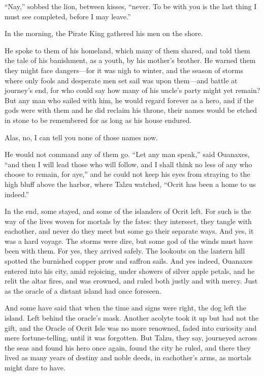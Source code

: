 ``Nay,'' sobbed the lion, between kisses, ``never. To be with you is the last thing I must see completed, before I may leave.''

In the morning, the Pirate King gathered his men on the shore.

He spoke to them of his homeland, which many of them shared, and told them the tale of his banishment, as a youth, by his mother's brother. He warned them they might face dangers---for it was nigh to winter, and the season of storms where only fools and desperate men set sail was upon them---and battle at journey's end, for who could say how many of his uncle's party might yet remain? But any man who sailed with him, he would regard forever as a hero, and if the gods were with them and he did reclaim his throne, their names would be etched in stone to be remembered for as long as his house endured.

Alas, no, I can tell you none of those names now.

He would not command any of them go. ``Let any man speak,'' said Ouanaxes, ``and then I will lead those who will follow, and I shall think no less of any who choose to remain, for aye,'' and he could not keep his eyes from straying to the high bluff above the harbor, where Talzu watched, ``Ocrit has been a home to us indeed.''

In the end, some stayed, and some of the islanders of Ocrit left. For such is the way of the lives woven for mortals by the fates: they intersect, they tangle with eachother, and never do they meet but some go their separate ways. And yes, it was a hard voyage. The storms were dire, but some god of the winds must have been with them. For yes, they arrived safely. The lookouts on the lantern hill spotted the burnished copper prow and saffron sails. And yes indeed, Ouanaxes entered into his city, amid rejoicing, under showers of silver apple petals, and he relit the altar fires, and was crowned, and ruled both justly and with mercy. Just as the oracle of a distant island had once foreseen.

And some have said that when the time and signs were right, the dog left the island. Left behind the oracle's mask. Another acolyte took it up but had not the gift, and the Oracle of Ocrit Isle was no more renowned, faded into curiosity and mere fortune-telling, until it was forgotten. But Talzu, they say, journeyed across the seas and found his hero once again, found the city he ruled, and there they lived as many years of destiny and noble deeds, in eachother's arms, as mortals might dare to have.

